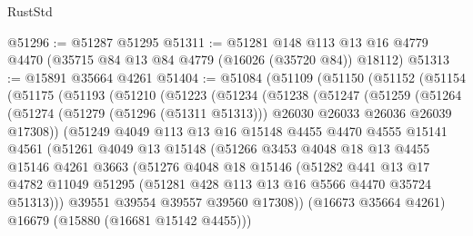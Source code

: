 \begin{lexlean}{RustStd}
\begin{coremodule}
@51296 := @51287 @51295
@51311 := @51281
    @148
    @113
    @13
    @16
    @4779
    @4470
    (@35715 @84 @13 @84 @4779 (@16026 (@35720 @84)) @18112)
@51313 := @15891 @35664 @4261
@51404 := @51084
    (@51109
      (@51150
        (@51152
          (@51154
            (@51175
              (@51193
                (@51210
                  (@51223
                    (@51234
                      (@51238
                        (@51247
                          (@51259
                            (@51264
                              (@51274
                                (@51279 (@51296 (@51311 @51313)))
                                @26030
                                @26033
                                @26036
                                @26039
                                @17308))
                            (@51249
                              @4049
                              @113
                              @13
                              @16
                              @15148
                              @4455
                              @4470
                              @4555
                              @15141
                              @4561
                              (@51261
                                @4049
                                @13
                                @15148
                                (@51266
                                  @3453
                                  @4048
                                  @18
                                  @13
                                  @4455
                                  @15146
                                  @4261
                                  @3663
                                  (@51276
                                    @4048
                                    @18
                                    @15146
                                    (@51282
                                      @441
                                      @13
                                      @17
                                      @4782
                                      @11049
                                      @51295
                                      (@51281 @428 @113 @13 @16 @5566 @4470 @35724 @51313)))
                                  @39551
                                  @39554
                                  @39557
                                  @39560
                                  @17308))
                              (@16673 @35664 @4261)
                              @16679
                              (@15880 (@16681 @15142 @4455)))

\end{coremodule}
\end{lexlean}
